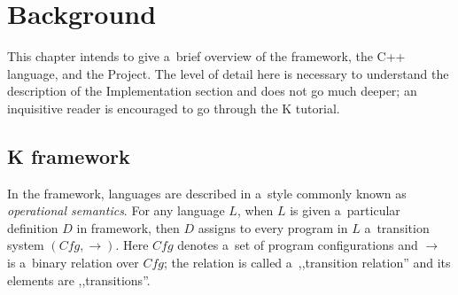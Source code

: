 \documentclass{fithesis3}
\newcommand{\var}[1]{\mathit{#1}\xspace}
\newcommand{\Project}{Project\xspace}
\begin{document}




\chapter{Background}
This chapter intends to give a~brief overview of the \K framework, the C++ language, and the \Project.
The level of detail here is necessary to understand the description of the Implementation section and does not go much deeper; an inquisitive reader is encouraged to go through the K tutorial. %

\section{K framework}

%





In the \K framework, languages are described in a~style commonly known as \textit{operational semantics}. For any language $\var{L}$, when $\var{L}$ is given a~particular definition $\var{D}$ in \K framework, then $\var{D}$ assigns to every program in $\var{L}$ a~transition system $( \var{Cfg}, \rightarrow )$. Here $\var{Cfg}$ denotes a~set of program configurations and $\rightarrow$ is a~binary relation over $\var{Cfg}$; the relation is called a~,,transition relation'' and its elements are ,,transitions''. %
\end{document}
